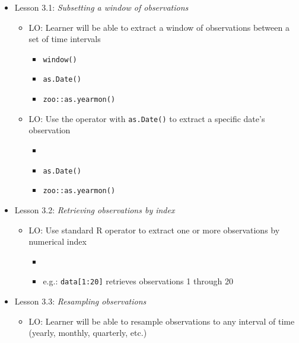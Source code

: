 \documentclass[
]{book}
\providecommand{\tightlist}{%
  \setlength{\itemsep}{0pt}\setlength{\parskip}{0pt}}
\begin{document}
\begin{itemize}
\tightlist
\item
  Lesson 3.1: \emph{Subsetting a window of observations}

  \begin{itemize}
  \tightlist
  \item
    LO: Learner will be able to extract a window of observations between a set of time intervals

    \begin{itemize}
    \tightlist
    \item
      \texttt{window()}
    \item
      \texttt{as.Date()}
    \item
      \texttt{zoo::as.yearmon()}
    \end{itemize}
  \item
    LO: Use the \texttt{\textquotesingle{}{[}\textquotesingle{}} operator with \texttt{as.Date()} to extract a specific date's observation

    \begin{itemize}
    \tightlist
    \item
      \texttt{\textquotesingle{}{[}\textquotesingle{}}
    \item
      \texttt{as.Date()}
    \item
      \texttt{zoo::as.yearmon()}
    \end{itemize}
  \end{itemize}
\item
  Lesson 3.2: \emph{Retrieving observations by index}

  \begin{itemize}
  \tightlist
  \item
    LO: Use standard R \texttt{\textquotesingle{}{[}\textquotesingle{}} operator to extract one or more observations by numerical index

    \begin{itemize}
    \tightlist
    \item
      \texttt{\textquotesingle{}{[}\textquotesingle{}}
    \item
      e.g.: \texttt{data{[}1:20{]}} retrieves observations 1 through 20
    \end{itemize}
  \end{itemize}
\item
  Lesson 3.3: \emph{Resampling observations}

  \begin{itemize}
  \tightlist
  \item
    LO: Learner will be able to resample observations to any interval of time (yearly, monthly, quarterly, etc.)


\end{itemize}
\end{itemize}
\end{document}
